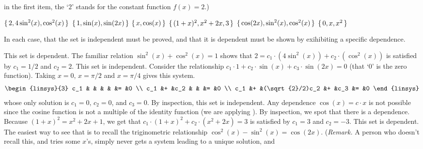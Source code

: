 \begin{exercises}
     in the first item, 
     the `$2$' stands for the constant function $f(x)=2$.)
    \begin{exparts*}
      \partsitem \( \mbox{$\{\,2,4\sin^2(x),\cos^2(x)\,\}$} \)
      \partsitem \( \mbox{$\{\,1,\sin(x),\sin(2x)\,\}$} \)
      \partsitem \( \mbox{$\{\,x,\cos(x)\,\}$} \)
      \partsitem \( \mbox{$\{\,(1+x)^2,x^2+2x,3\,\}$} \)
      \partsitem \( \mbox{$\{\,\cos(2x),\sin^2(x),\cos^2(x)\,\}$} \)
      \partsitem \( \mbox{$\{\,0,x,x^2\,\}$} \)
    \end{exparts*}
    \begin{answer}
      In each case, that the set is independent must be proved, and that it is
      dependent must be shown by exihibiting a specific dependence.
      \begin{exparts}
        \partsitem This set is dependent.
          The familiar relation $\sin^2(x)+\cos^2(x)=1$ shows that
          $2=c_1\cdot(4\sin^2(x))+c_2\cdot(\cos^2(x))$ is satisfied by
          $c_1=1/2$ and $c_2=2$.
        \partsitem This set is independent.
          Consider the relationship
          $c_1\cdot 1+c_2\cdot\sin(x)+c_3\cdot\sin(2x)=0$
          (that `$0$' is the zero function).
          Taking $x=0$, $x=\pi/2$ and $x=\pi/4$ gives this system.
          \begin{equation*}
            \begin{linsys}{3}
               c_1  &   &                &   &      &=  &0  \\
               c_1  &+  &c_2             &   &      &=  &0  \\
               c_1  &+  &(\sqrt{2}/2)c_2 &+  &c_3   &=  &0  
            \end{linsys}
          \end{equation*}
          whose only solution is 
          $c_1=0$, $c_2=0$, and $c_3=0$. 
        \partsitem By inspection, this set is independent.
          Any dependence $\cos(x)=c\cdot x$ is not possible since the cosine
          function is not a multiple of the identity function
          (we are applying ).
        \partsitem By inspection, we spot that there is a dependence.
          Because $(1+x)^2=x^2+2x+1$, we get that
          $c_1\cdot(1+x)^2+c_2\cdot(x^2+2x)=3$ is satisfied by 
          $c_1=3$ and $c_2=-3$.
        \partsitem This set is dependent.
          The easiest way to see that is to recall the triginometric
          relationship $\cos^2(x)-\sin^2(x)=\cos(2x)$.
          (\textit{Remark.} 
          A person who doesn't recall this, and tries some $x$'s,
          simply never gets a system leading to a unique solution, and

\end{exparts}
\end{answer}
\end{exercises}
